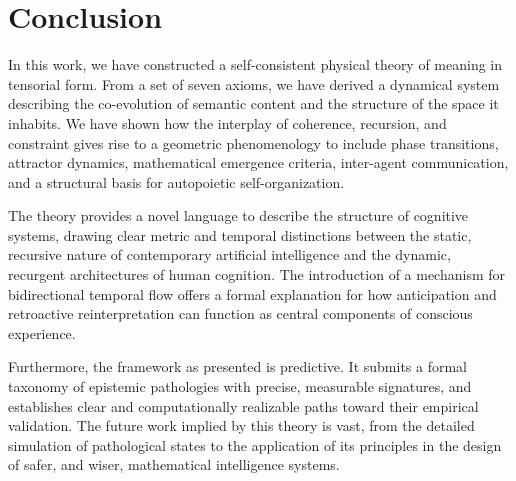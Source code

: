 
\section{Conclusion}
\label{17.7:conclusion}

In this work, we have constructed a self-consistent physical theory of meaning in tensorial form. From a set of seven axioms, we have derived a dynamical system describing the co-evolution of semantic content and the structure of the space it inhabits. We have shown how the interplay of coherence, recursion, and constraint gives rise to a geometric phenomenology to include phase transitions, attractor dynamics, mathematical emergence criteria, inter-agent communication, and a structural basis for autopoietic self-organization.

The theory provides a novel language to describe the structure of cognitive systems, drawing clear metric and temporal distinctions between the static, recursive nature of contemporary artificial intelligence and the dynamic, recurgent architectures of human cognition. The introduction of a mechanism for bidirectional temporal flow offers a formal explanation for how anticipation and retroactive reinterpretation can function as central components of conscious experience.

Furthermore, the framework as presented is predictive. It submits a formal taxonomy of epistemic pathologies with precise, measurable signatures, and establishes clear and computationally realizable paths toward their empirical validation. The future work implied by this theory is vast, from the detailed simulation of pathological states to the application of its principles in the design of safer, and wiser, mathematical intelligence systems.